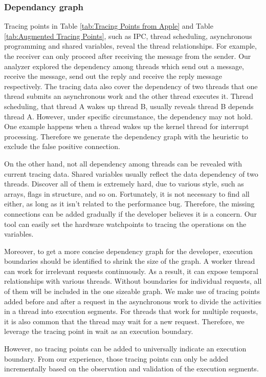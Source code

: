 \subsubsection{Dependancy graph}
Tracing points in Table \ref{tab:Tracing Points from Apple} and Table \ref{tab:Augmented Tracing Points},
such as IPC, thread scheduling, asynchronous programming and shared variables, reveal the thread relationships.
For example, the receiver can only proceed after receiving the message from the sender. 
Our analyzer explored the dependency among threads which send out a message, receive the message, send out the reply and receive the reply message respectively.
The tracing data also cover the dependency of two threads that one thread submits an asynchronous work and the other thread executes it.
Thread scheduling, that thread A wakes up thread B, usually reveals thread B depends thread A.
However, under specific circumstance, the dependency may not hold.
One example happens when a thread wakes up the kernel thread for interrupt processing. 
Therefore we generate the dependency graph with the heuristic to exclude the false positive connection.
\par
On the other hand, not all dependency among threads can be revealed with current tracing data.
Shared variables usually reflect the data dependency of two threads.
Discover all of them is extremely hard, due to various style, such as arrays, flags in structure, and so on.
Fortunately, it is not necessary to find all either, as long as it isn't related to the performance bug.
Therefore, the missing connections can be added gradually if the developer believes it is a concern.
Our tool can easily set the hardware watchpoints to tracing the operations on the variables.
\par
Moreover, to get a more concise dependency graph for the developer, execution boundaries should be identified to shrink the size of the graph.
A worker thread can work for irrelevant requests continuously.
As a result, it can expose temporal relationships with various threads.
Without boundaries for individual requests, all of them will be included in the one sizeable graph.
We make use of tracing points added before and after a request in the asynchronous work to divide the activities in a thread into execution segments.
For threads that work for multiple requests, it is also common that the thread may wait for a new request.
Therefore, we leverage the tracing point in wait as an execution boundary.
\par
However, no tracing points can be added to universally indicate an execution boundary.
From our experience, those tracing points can only be added incrementally based on the observation and validation of the execution segments.\par
